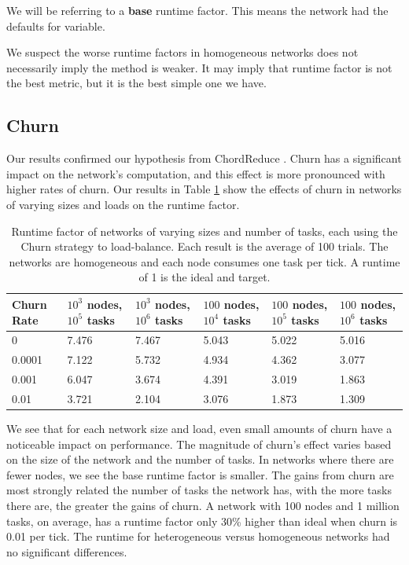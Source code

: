 \documentclass[11pt,conference]{IEEEtran}
\begin{document}
We will be referring to a \textbf{base} runtime factor.
This means the network had the defaults for variable.
{We suspect the worse runtime factors in homogeneous networks does not necessarily imply the method is weaker.
	It may imply that runtime factor is not the best metric, but it is the best simple one we have.
	
	
	\subsection{Churn}
	
	Our results confirmed our hypothesis from ChordReduce \cite{chordreduce}.
	Churn has a significant impact on the network's computation, and this effect is more pronounced with higher rates of churn.
	Our results in Table \ref{tab:ChurnRuntimesHomogenious} show the effects of churn in networks of varying sizes and loads on the runtime factor.
	
	
	\begin{table}[h]
		\small
		\centering
		\caption[Churn Runtimes in a homogenious network]{Runtime factor of networks of varying sizes and number of tasks, each using the Churn strategy to load-balance.  Each result is the average of 100 trials. The networks are homogeneous and each node consumes one task per tick.  A runtime of 1 is the ideal and target.}
		\begin{tabular}{|p{1cm} || p{1cm}  |p{1cm}  |p{1cm}  | p{1cm}  | p{1cm}  |}
			\hline
			Churn Rate & $ 10^{3}$ nodes, $ 10^{5}$ tasks & $ 10^{3}$ nodes, $ 10^{6}$ tasks & $ 100$ nodes, $ 10^{4}$ tasks & $ 100$ nodes, $ 10^{5}$ tasks &$ 100$ nodes, $ 10^{6}$ tasks \\ \hline
			0      & 7.476   &  7.467 &  5.043& 5.022 &5.016 \\\hline
			0.0001 & 7.122   &  5.732 &  4.934& 4.362&3.077 \\\hline
			0.001  & 6.047   &  3.674 &  4.391& 3.019  &1.863\\\hline
			0.01  &  3.721   &  2.104 &  3.076& 1.873 &1.309\\\hline
			
		\end{tabular}
		\label{tab:ChurnRuntimesHomogenious}
	\end{table}
	
	We see that for each network size and load, even small amounts of churn have a noticeable impact on performance.
	The magnitude of churn's effect varies based on the size of the network and the number of tasks.
	In networks where there are fewer nodes, we see the base runtime factor is smaller.
	The gains from churn are most strongly related the number of tasks the network has, with the more tasks there are, the greater the gains of churn.
	A network with 100 nodes and 1 million tasks, on average, has a runtime factor only 30\% higher than ideal when churn is 0.01 per tick.
	The runtime for heterogeneous versus homogeneous networks had no significant differences.
	
}
\end{document}
